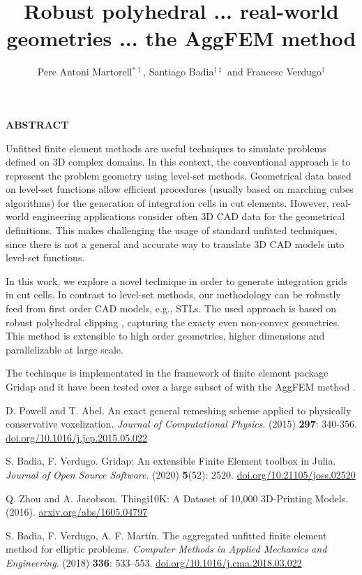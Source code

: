 \documentclass{coupled2019_abstract}
\title{ Robust polyhedral ... real-world geometries ... the AggFEM method }
\author{Pere Antoni Martorell$^{*\dag}$, Santiago Badia$^{\dag\ddag}$ and Francesc Verdugo$^{\dag}$ }
\begin{document}
\begin{center}
\bf ABSTRACT
\end{center}

Unfitted finite element methods are useful techniques to simulate problems defined on 3D complex domains. 
In this context, the conventional approach is to represent the problem geometry using level-set methods. 
Geometrical data based on level-set functions allow efficient procedures (usually based on marching cubes algorithms) for the generation of integration cells in cut elements. 
However, real-world engineering applications consider often 3D CAD data for the geometrical definitions. 
This makes challenging the usage of standard unfitted techniques, since there is not a general and accurate way to translate 3D CAD models into level-set functions.

In this work, we explore a novel technique in order to generate integration grids in cut cells.
In contrast to level-set methods, our methodology can be robustly feed from first order CAD models, e.g., STLs.
The used approach is based on robust polyhedral clipping \cite{Powel}, capturing the exacty even non-convex geometries.
This method is extensible to high order geometries, higher dimensions and parallelizable at large scale.

The techinque is implementated in the framework of finite element package Gridap \cite{Gridap} and it have been tested over a large subset of \cite{10k} with the AggFEM method \cite{AgFEM}.


\begin{thebibliography}{99}

D. Powell and T. Abel. 
An exact general remeshing scheme applied to physically conservative voxelization.
\textit{Journal of Computational Physics}.
(2015) \textbf{297}: 340-356. 
\url{doi.org/10.1016/j.jcp.2015.05.022}

S. Badia, F. Verdugo.
Gridap: An extensible Finite Element toolbox in Julia.
\textit{Journal of Open Source Software}. 
(2020) \textbf{5}(52): 2520.
\url{doi.org/10.21105/joss.02520}

Q. Zhou and A. Jacobson. 
Thingi10K: A Dataset of 10,000 3D-Printing Models.
(2016).
\url{arxiv.org/abs/1605.04797}

S. Badia, F. Verdugo, A. F. Mart\'in.
The aggregated unfitted finite element method for elliptic problems.
\textit{Computer Methods in Applied Mechanics and Engineering}. 
(2018) \textbf{336}: 533--553. 
\url{doi.org/10.1016/j.cma.2018.03.022}


\end{thebibliography}
\end{document}
